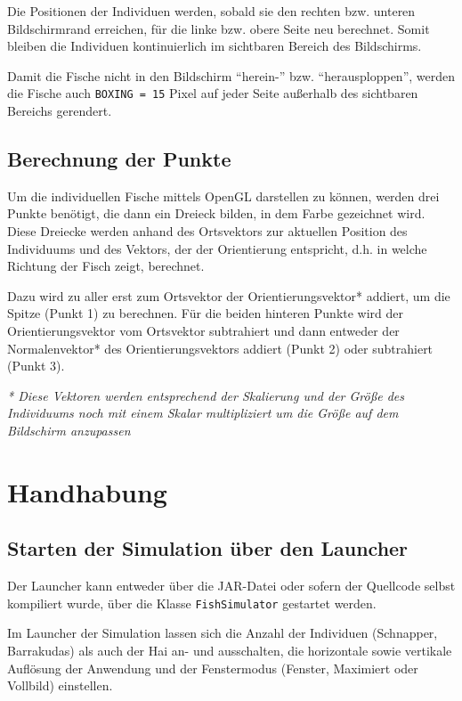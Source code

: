 \documentclass[11pt]{article}
\begin{document}
\vspace{0.5em}
Die Positionen der Individuen werden, sobald sie den rechten bzw. unteren Bildschirmrand erreichen, für die linke bzw. obere Seite neu berechnet. Somit bleiben die Individuen kontinuierlich im sichtbaren Bereich des Bildschirms.

\vspace{0.5em}
Damit die Fische nicht in den Bildschirm ``herein-'' bzw. ``herausploppen'', werden die Fische auch \lstinline{BOXING = 15} Pixel auf jeder Seite außerhalb des sichtbaren Bereichs gerendert.
\subsection{Berechnung der Punkte}
Um die individuellen Fische mittels OpenGL darstellen zu können, werden drei Punkte benötigt, die dann ein Dreieck bilden, in dem Farbe gezeichnet wird. Diese Dreiecke werden anhand des Ortsvektors zur aktuellen Position des Individuums und des Vektors, der der Orientierung entspricht, d.h. in welche Richtung der Fisch zeigt, berechnet.

\vspace{0.5em}
Dazu wird zu aller erst zum Ortsvektor der Orientierungsvektor* addiert, um die Spitze (Punkt 1) zu berechnen. Für die beiden hinteren Punkte wird der Orientierungsvektor vom Ortsvektor subtrahiert und dann entweder der Normalenvektor* des Orientierungsvektors addiert (Punkt 2) oder subtrahiert (Punkt 3).

\vspace{0.5em}
\textit{* Diese Vektoren werden entsprechend der Skalierung und der Größe des Individuums noch mit einem Skalar multipliziert um die Größe auf dem Bildschirm anzupassen}


\section{Handhabung}
\subsection{Starten der Simulation über den Launcher}
Der Launcher kann entweder über die JAR-Datei oder sofern der Quellcode selbst kompiliert wurde, über die Klasse \lstinline{FishSimulator} gestartet werden.

\vspace{0.5em}
Im Launcher der Simulation lassen sich die Anzahl der Individuen (Schnapper, Barrakudas) als auch der Hai an- und ausschalten, die horizontale sowie vertikale Auflösung der Anwendung und der Fenstermodus (Fenster, Maximiert oder Vollbild) einstellen.
\end{document}
